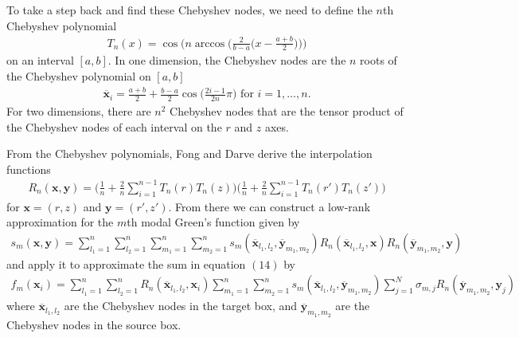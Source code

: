 \documentclass[11pt, oneside]{article}   	%
\begin{document}
To take a step back and find these Chebyshev nodes, we need to define the $n$th Chebyshev polynomial
\begin{align*}
T_n(x)=\cos\bigg(n\arccos\bigg(\frac{2}{b-a}\bigg(x-\frac{a+b}{2}\bigg)\bigg)\bigg)
\end{align*}
on an interval $[a,b]$. In one dimension, the Chebyshev nodes are the $n$ roots of the Chebyshev polynomial on $[a,b]$
\begin{align*}
\mathbf{\overline{x}}_i=\frac{a+b}{2}+\frac{b-a}{2}\cos\bigg(\frac{2i-1}{2n}\pi\bigg)\mbox{ for }i=1,\dots,n.
\end{align*}
For two dimensions, there are $n^2$ Chebyshev nodes that are the tensor product of the Chebyshev nodes of each interval on the $r$ and $z$ axes.

From the Chebyshev polynomials, Fong and Darve derive the interpolation functions
\begin{align*}
R_n(\mathbf{x},\mathbf{y}) = \bigg(\frac{1}{n} + \frac{2}{n}\sum_{i=1}^{n-1}T_n(r)T_n(z)\bigg)\bigg(\frac{1}{n} + \frac{2}{n}\sum_{i=1}^{n-1}T_n(r')T_n(z')\bigg)
\end{align*}
for $\mathbf{x}=(r,z)$ and $\mathbf{y}=(r',z')$. From there we can construct a low-rank approximation for the $m$th modal Green's function given by
\begin{align}
s_m(\mathbf{x},\mathbf{y}) = \sum_{l_1=1}^n\sum_{l_2=1}^n\sum_{m_1=1}^n\sum_{m_2=1}^n s_m(\mathbf{\overline{x}}_{l_1,l_2},\mathbf{\overline{y}}_{m_1,m_2})R_n(\mathbf{\overline{x}}_{l_1,l_2},\mathbf{x})R_n(\mathbf{\overline{y}}_{m_1,m_2},\mathbf{y})
\end{align}
and apply it to approximate the sum in equation $(14)$ by
\begin{align}
f_m(\mathbf{x}_i)=\sum_{l_1=1}^n \sum_{l_2=1}^n R_n(\mathbf{\overline{x}}_{l_1,l_2},\mathbf{x}_i) \sum_{m_1=1}^n \sum_{m_2=1}^n s_m(\mathbf{\overline{x}}_{l_1,l_2},\mathbf{\overline{y}}_{m_1,m_2}) \sum_{j=1}^N \sigma_{m,j}R_n(\mathbf{\overline{y}}_{m_1,m_2},\mathbf{y}_j)
\end{align}
where $\mathbf{\overline{x}}_{l_1,l_2}$ are the Chebyshev nodes in the target box, and $\mathbf{\overline{y}}_{m_1,m_2}$ are the Chebyshev nodes in the source box.
\end{document}
